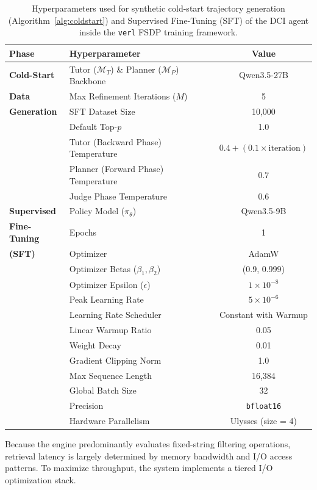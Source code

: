 \documentclass{llmxive}
\begin{document}
\begin{table}[!t]
\centering
\begin{tabular}{llc}
\toprule
\textbf{Phase} & \textbf{Hyperparameter} & \textbf{Value} \\
\midrule
\textbf{Cold-Start} 
& Tutor ($\mathcal{M}_T$) \& Planner ($\mathcal{M}_P$) Backbone & Qwen3.5-27B \\
\textbf{Data} 
& Max Refinement Iterations ($M$) & 5 \\
\textbf{Generation} 
& SFT Dataset Size & 10,000 \\
& Default Top-$p$ & 1.0 \\
& Tutor (Backward Phase) Temperature & $0.4 + (0.1 \times \text{iteration})$ \\
& Planner (Forward Phase) Temperature & $0.7$ \\
& Judge Phase Temperature & $0.6$ \\
\midrule
\textbf{Supervised} 
& Policy Model ($\pi_\theta$) & Qwen3.5-9B \\
\textbf{Fine-Tuning} 
& Epochs & 1 \\
\textbf{(SFT)} 
& Optimizer & AdamW \\
& Optimizer Betas ($\beta_1, \beta_2$) & (0.9, 0.999) \\
& Optimizer Epsilon ($\epsilon$) & $1 \times 10^{-8}$ \\
& Peak Learning Rate & $5 \times 10^{-6}$ \\
& Learning Rate Scheduler & Constant with Warmup \\
& Linear Warmup Ratio & 0.05 \\
& Weight Decay & 0.01 \\
& Gradient Clipping Norm & 1.0 \\
& Max Sequence Length & 16,384 \\
& Global Batch Size & 32 \\
& Precision & \texttt{bfloat16} \\
& Hardware Parallelism & Ulysses (size = 4) \\
\bottomrule
\end{tabular}
\caption{Hyperparameters used for synthetic cold-start trajectory generation (Algorithm~\ref{alg:coldstart}) and Supervised Fine-Tuning (SFT) of the DCI agent inside the \texttt{verl} FSDP training framework.}
\label{tab:hyperparams-sft}
\end{table}


Because the engine predominantly evaluates fixed-string filtering operations, retrieval latency is largely determined by memory bandwidth and I/O access patterns. To maximize throughput, the system implements a tiered I/O optimization stack.
\end{document}
